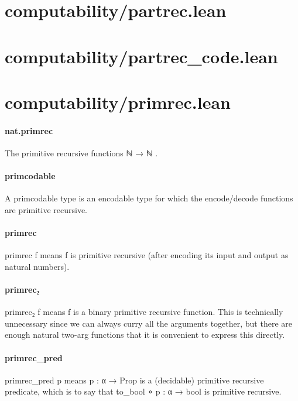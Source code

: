 \documentclass{article}
\begin{document}
\section{computability/partrec.lean}\section{computability/partrec\_code.lean}\section{computability/primrec.lean}\paragraph{nat.primrec}
\par
The primitive recursive functions 
\colorbox[RGB]{253,246,227}{{{{\color[RGB]{101, 123, 131} ℕ  }}}{{{\color[RGB]{133, 153, 0} → }}}{{{\color[RGB]{101, 123, 131}  ℕ }}}}.
\paragraph{primcodable}
\par
A 
\colorbox[RGB]{253,246,227}{{{{\color[RGB]{101, 123, 131} primcodable }}}} type is an 
\colorbox[RGB]{253,246,227}{{{{\color[RGB]{101, 123, 131} encodable }}}} type for which
the encode/decode functions are primitive recursive.
\paragraph{primrec}
\par
\colorbox[RGB]{253,246,227}{{{{\color[RGB]{101, 123, 131} primrec f }}}} means 
\colorbox[RGB]{253,246,227}{{{{\color[RGB]{101, 123, 131} f }}}} is primitive recursive (after
encoding its input and output as natural numbers).
\paragraph{primrec₂}
\par
\colorbox[RGB]{253,246,227}{{{{\color[RGB]{101, 123, 131} primrec₂ f }}}} means 
\colorbox[RGB]{253,246,227}{{{{\color[RGB]{101, 123, 131} f }}}} is a binary primitive recursive function.
This is technically unnecessary since we can always curry all
the arguments together, but there are enough natural two-arg
functions that it is convenient to express this directly.
\paragraph{primrec\_pred}
\par
\colorbox[RGB]{253,246,227}{{{{\color[RGB]{101, 123, 131} primrec\_pred p }}}} means 
\colorbox[RGB]{253,246,227}{{{{\color[RGB]{101, 123, 131} p : α  }}}{{{\color[RGB]{133, 153, 0} → }}}{{{\color[RGB]{101, 123, 131}   }}}{{{\color[RGB]{38, 139, 210} Prop }}}} is a (decidable)
primitive recursive predicate, which is to say that
\colorbox[RGB]{253,246,227}{{{{\color[RGB]{101, 123, 131} to\_bool ∘ p : α  }}}{{{\color[RGB]{133, 153, 0} → }}}{{{\color[RGB]{101, 123, 131}  bool }}}} is primitive recursive.
\end{document}
